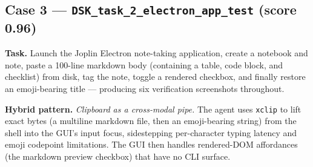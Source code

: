 \documentclass{llmxive}
\begin{document}
\subsection{Case 3 --- \texttt{DSK\_task\_2\_electron\_app\_test} (score 0.96)}
\label{app:case-electron}

\textbf{Task.} Launch the Joplin Electron note-taking application, create a notebook and note, paste a 100-line markdown body (containing a table, code block, and checklist) from disk, tag the note, toggle a rendered checkbox, and finally restore an emoji-bearing title --- producing six verification screenshots throughout.

\textbf{Hybrid pattern.} \emph{Clipboard as a cross-modal pipe.} The agent uses \texttt{xclip} to lift exact bytes (a multiline markdown file, then an emoji-bearing string) from the shell into the GUI's input focus, sidestepping per-character typing latency and emoji codepoint limitations. The GUI then handles rendered-DOM affordances (the markdown preview checkbox) that have no CLI surface.
\end{document}
